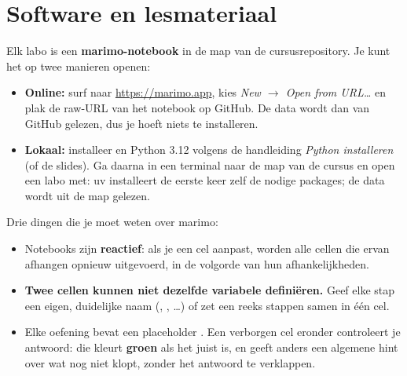 \section{Software en lesmateriaal}

Elk labo is een \textbf{marimo-notebook} in de map  van de
cursusrepository. Je kunt het op twee manieren openen:

\begin{itemize}
    \item \textbf{Online:} surf naar \url{https://marimo.app}, kies
        \emph{New $\rightarrow$ Open from URL\dots} en plak de raw-URL van
        het notebook op GitHub. De data wordt dan van GitHub gelezen, dus
        je hoeft niets te installeren.
    \item \textbf{Lokaal:} installeer  en Python 3.12 volgens de
        handleiding \emph{Python installeren} (of de slides). Ga daarna in
        een terminal naar de map van de cursus en open een labo met:\newline
        \newline uv
        installeert de eerste keer zelf de nodige packages; de data wordt
        uit de map  gelezen.

\end{itemize}

Drie dingen die je moet weten over marimo:

\begin{itemize}
  \item Notebooks zijn \textbf{reactief}: als je een cel aanpast, worden
        alle cellen die ervan afhangen opnieuw uitgevoerd, in de volgorde
        van hun afhankelijkheden.
  \item \textbf{Twee cellen kunnen niet dezelfde variabele definiëren.}
        Geef elke stap een eigen, duidelijke naam (,
        , \dots) of zet een reeks stappen samen in één
        cel.
  \item Elke oefening bevat een placeholder . Een verborgen cel
        eronder controleert je antwoord: die kleurt \textbf{groen} als het
        juist is, en geeft anders een algemene hint over wat nog niet
        klopt, zonder het antwoord te verklappen.
\end{itemize}
